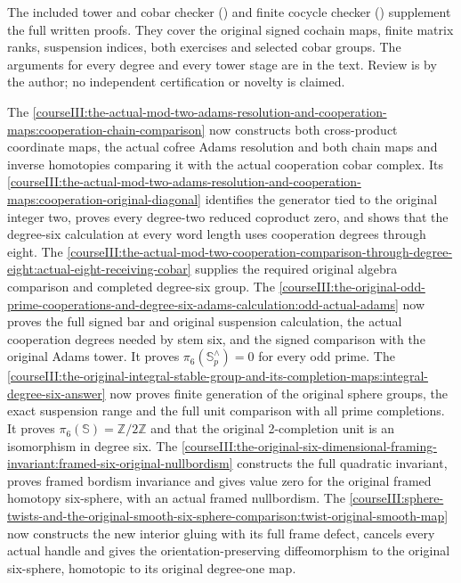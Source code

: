 The included tower and cobar checker () and finite cocycle checker () supplement the full written proofs. They cover the original signed cochain maps, finite matrix ranks, suspension indices, both exercises and selected cobar groups. The arguments for every degree and every tower stage are in the text. Review is by the author; no independent certification or novelty is claimed.

The \cref{courseIII:the-actual-mod-two-adams-resolution-and-cooperation-maps:cooperation-chain-comparison} now constructs both cross-product coordinate maps, the actual cofree Adams resolution and both chain maps and inverse homotopies comparing it with the actual cooperation cobar complex. Its \cref{courseIII:the-actual-mod-two-adams-resolution-and-cooperation-maps:cooperation-original-diagonal} identifies the generator tied to the original integer two, proves every degree-two reduced coproduct zero, and shows that the degree-six calculation at every word length uses cooperation degrees through eight. The \cref{courseIII:the-actual-mod-two-cooperation-comparison-through-degree-eight:actual-eight-receiving-cobar} supplies the required original algebra comparison and completed degree-six group. The \cref{courseIII:the-original-odd-prime-cooperations-and-degree-six-adams-calculation:odd-actual-adams} now proves the full signed bar and original suspension calculation, the actual cooperation degrees needed by stem six, and the signed comparison with the original Adams tower. It proves \(\pi_6(\mathbb S^{\wedge}_p)=0\) for every odd prime. The \cref{courseIII:the-original-integral-stable-group-and-its-completion-maps:integral-degree-six-answer} now proves finite generation of the original sphere groups, the exact suspension range and the full unit comparison with all prime completions. It proves \(\pi_6(\mathbb S)=\mathbb Z/2\mathbb Z\) and that the original 2-completion unit is an isomorphism in degree six. The \cref{courseIII:the-original-six-dimensional-framing-invariant:framed-six-original-nullbordism} constructs the full quadratic invariant, proves framed bordism invariance and gives value zero for the original framed homotopy six-sphere, with an actual framed nullbordism. The \cref{courseIII:sphere-twists-and-the-original-smooth-six-sphere-comparison:twist-original-smooth-map} now constructs the new interior gluing with its full frame defect, cancels every actual handle and gives the orientation-preserving diffeomorphism to the original six-sphere, homotopic to its original degree-one map.
